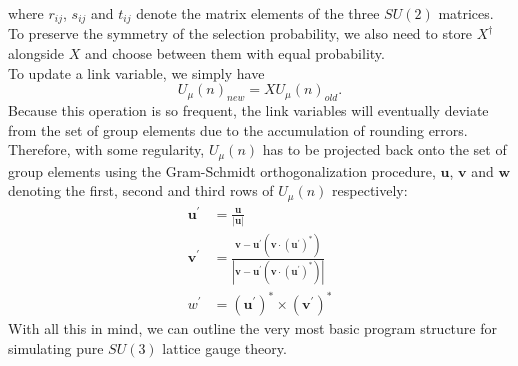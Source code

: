 \documentclass[a4paper,10pt]{book}
\begin{document}
where $r_{ij}$, $s_{ij}$ and $t_{ij}$ denote the matrix elements of the three $SU(2)$ matrices. To preserve the symmetry of the selection probability, we also need to store $X^\dagger$ alongside $X$ and choose between them with equal probability.\\To update a link variable, we simply have
\begin{equation}
U_\mu(n)_{new}= XU_\mu(n)_{old}.
\end{equation}
Because this operation is so frequent, the link variables will eventually deviate from the set of group elements due to the accumulation of rounding errors. Therefore, with some regularity, $U_\mu(n)$ has to be projected back onto the set of group elements using the Gram-Schmidt orthogonalization procedure, $\boldsymbol{u}$, $\boldsymbol{v}$ and $\boldsymbol{w}$ denoting the first, second and third rows of $U_\mu(n)$ respectively:
\begin{equation}
\begin{aligned}
\boldsymbol{u}^\prime &=\frac{\boldsymbol{u}}{|\boldsymbol{u}| }\\
\boldsymbol{v}^\prime &=\frac{\boldsymbol{v}-\boldsymbol{u}^\prime\left(\boldsymbol{v} \cdot (\boldsymbol{u}^\prime)^{*}\right)}{\left|\boldsymbol{v}-\boldsymbol{u}^\prime\left(\boldsymbol{v} \cdot (\boldsymbol{u}^\prime)^{*}\right)\right|}\\ w^\prime &=(\boldsymbol{u}^\prime)^{*}\times(\boldsymbol{v}^\prime)^{*}
\end{aligned}
\end{equation}
With all this in mind, we can outline the very most basic program structure for simulating pure $SU(3)$ lattice gauge theory.
\end{document}
